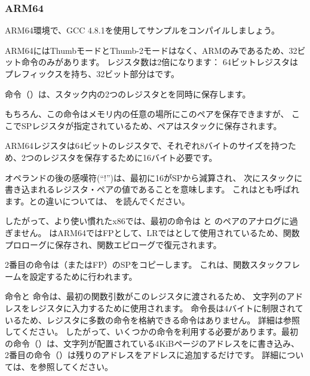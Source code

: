﻿\subsubsection{ARM64}


ARM64環境で、GCC 4.8.1を使用してサンプルをコンパイルしましょう。



ARM64にはThumbモードとThumb-2モードはなく、ARMのみであるため、32ビット命令のみがあります。
レジスタ数は2倍になります：
64ビットレジスタはプレフィックスを持ち、32ビット部分はです。

命令（）は、スタック内の2つのレジスタとを同時に保存します。

もちろん、この命令はメモリ内の任意の場所にこのペアを保存できますが、
ここで\ac{SP}レジスタが指定されているため、ペアはスタックに保存されます。

ARM64レジスタは64ビットのレジスタで、それぞれ8バイトのサイズを持つため、2つのレジスタを保存するために16バイト必要です。

オペランドの後の感嘆符(``!'')は、最初に16が\ac{SP}から減算され、
次にスタックに書き込まれるレジスタ・ペアの値であることを意味します。
これはとも呼ばれます。との違いについては、
 を読んでください。

したがって、より使い慣れたx86では、最初の命令は と のペアのアナログに過ぎません。
はARM64では\ac{FP}として、\ac{LR}ではとして使用されているため、関数プロローグに保存され、関数エピローグで復元されます。

2番目の命令は（または\ac{FP}）の\ac{SP}をコピーします。
これは、関数スタックフレームを設定するために行われます。

\label{pointers_ADRP_and_ADD}
命令と \ADD 命令は、最初の関数引数がこのレジスタに渡されるため、
文字列のアドレスをレジスタに入力するために使用されます。
命令長は4バイトに制限されているため、レジスタに多数の命令を格納できる命令はありません。
詳細は参照してください。
したがって、いくつかの命令を利用する必要があります。最初の命令（）は、文字列が配置されている4KiBページのアドレスをに書き込み、
2番目の命令（\ADD）は残りのアドレスをアドレスに追加するだけです。
詳細については、を参照してください。

